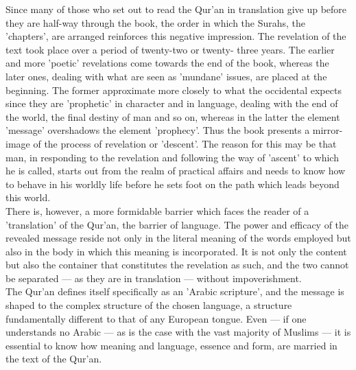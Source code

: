 \documentclass[11pt, b5paper, twoside]{book}
\begin{document}
Since many of those who set out to read the Qur'an in translation give up before they are half-way 
through the book, the order in which the Surahs, the 'chapters', are arranged reinforces this 
negative impression. The revelation of the text took place over a period of twenty-two or twenty-
three years. The earlier and more 'poetic' revelations come towards the end of the book, whereas the 
later ones, dealing with what are seen as 'mundane' issues, are placed at the beginning. The former 
approximate more closely to what the occidental expects since they are 'prophetic' in character and 
in language, dealing with the end of the world, the final destiny of man and so on, whereas in the 
latter the element 'message' overshadows the element 'prophecy'. Thus the book presents a mirror-
image of the process of revelation or 'descent'. The reason for this may be that man, in responding 
to the revelation and following the way of 'ascent' to which he is called, starts out from the realm 
of practical affairs and needs to know how to behave in his worldly life before he sets foot on the 
path which leads beyond this world. \\

There is, however, a more formidable barrier which faces the reader of a 'translation' of the Qur'an, 
the barrier of language. The power and efficacy of the revealed message reside not only in the 
literal meaning of the words employed but also in the body in which this meaning is incorporated. It 
is not only the content but also the container that constitutes the revelation as such, and the two 
cannot be separated --- as they are in translation --- without impoverishment. \\

The Qur'an defines itself specifically as an 'Arabic scripture', and the message is shaped to the 
complex structure of the chosen language, a structure fundamentally different to that of any European 
tongue. Even --- if one understands no Arabic --- as is the case with the vast majority of Muslims --- it 
is essential to know how meaning and language, essence and form, are married in the text of the 
Qur'an. \\
\end{document}

